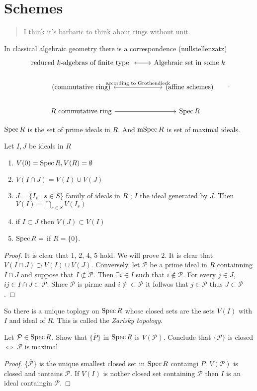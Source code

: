 \chapter{Schemes} \label{chap:schemes}
\begin{quote}
	I think it's barbaric to think about rings without unit.
\end{quote}
In classical algebraic geometry there is a correspondence (nullstellenzatz)
\[
\begin{tikzcd}
	\text{reduced $k$-algebras of finite type } \arrow[r, leftrightarrow] & \text{Algebraic set in some $k$} \\
	\left( \text{commutative ring} \right)  \arrow[r, leftrightarrow, "\text{according to Grothendieck}"] & \left( \text{affine schemes} \right) \\
	R \text{ commutative ring} \arrow[r] & \spec R 
\end{tikzcd}
.\] 
\begin{definition}
	$\operatorname{Spec} R$ is the set of prime ideals in $R$. And $\operatorname{mSpec} R$ is set of maximal ideals.
\end{definition}
\begin{lemma}
	Let $I, J$ be ideals in $R$ 
	\begin{enumerate}
		\item $V(0) = \operatorname{Spec} R, V(R) =  \emptyset$
		\item $V(I \cap J)  = V(I) \cup V(J)$
		\item $J = \{I_s \;|\; s \in S\} $ family of ideals in $R$ ; $I$ the ideal generated by $J$. 
			Then $V(I) = \bigcap_{s \in S}  V(I_s)$ 
		\item if $I \subset J$ then $V(J) \subset V(I)$ 
		\item $\spec R = \empty$ if $ R = \{0\} $.
	\end{enumerate}
\end{lemma}
\begin{proof}
	It is clear that 1, 2, 4, 5 hold. We will prove $2$.
	It is clear that  $V(I \cap  J) \supset V(I) \cup V(J)$. Conversely, let $\mathcal{P} $ be a prime ideal in $R$ containning $I \cap J$ and suppose that $I \not \subset  \mathcal{P} $. Then $\exists i \in I$ such that $i \not\in  \mathcal{P} $. 
	For every $j \in J$, $ij \in I \cap J \subset  \mathcal{P} $. 
	SInce $\mathcal{P} $ is pirme and $i \not\in \subset \mathcal{P} $ it follwos that $j \in \mathcal{P} $ thus $J \subset \mathcal{P} $. 
\end{proof}
So there is a unique toplogy on $\operatorname{Spec} R$ whose closed sets are the sets $V(I)$ with $I$ and ideal of $R$. 
This is called the \emph{Zarisky topology}.
\begin{exercise}
	Let  $\mathcal{P}  \in \operatorname{Spec} R$. Show that $\{\overline P\}  $ in $\operatorname{Spec} R$ is $V(\mathcal{P} )$. 
	Conclude that $\{ \mathcal{P}  \}$ is closed $\iff$ $\mathcal{P} $ is maximal
\end{exercise}
\begin{proof}
	$\overline{\{\mathcal{P} \} } $ is the unique smallest closed set in $\operatorname{Spec} R$ containgi $P$. 
	$V(\mathcal{P} )$ is closed and tontains $\mathcal{P} $. If $V(I)$ is nother closed set containing $\mathcal{P} $ then $I $ is an ideal containgin $\mathcal{P}$.
\end{proof}

